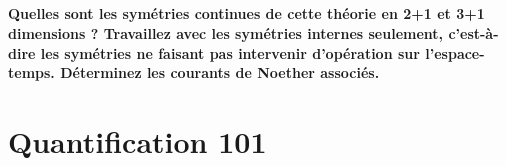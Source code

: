 \documentclass{article}
\numberwithin{equation}{section}
\theoremstyle{solution}
\begin{document}
\subsection{}
\textbf{Quelles sont les symétries continues de cette théorie en 2+1 et 3+1 dimensions ? Travaillez avec les symétries internes seulement, 
c’est-à-dire les symétries ne faisant pas intervenir d’opération sur l’espace-temps. Déterminez les courants de Noether associés.}

\section{Quantification 101}
\subsection{}
\subsection{}
\subsection{}
\end{document}
